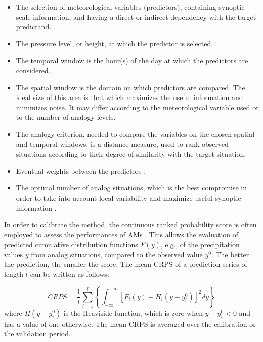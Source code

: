 \documentclass{ametsoc}
\begin{document}
\begin{itemize}
	\item The selection of meteorological variables (predictors), containing synoptic scale information, and having a direct or indirect dependency with the target predictand.
	\item The pressure level, or height, at which the predictor is selected.
	\item The temporal window is the hour(s) of the day at which the predictors are considered.
	\item The spatial window is the domain on which predictors are compared. The ideal size of this area is that which maximizes the useful information and minimizes noise. It may differ according to the meteorological variable used or to the number of analogy levels.
	\item The analogy criterion, needed to compare the variables on the chosen spatial and temporal windows, is a distance measure, used to rank observed situations according to their degree of similarity with the target situation.
	\item Eventual weights between the predictors \cite[e.g.,][]{Horton2012a, Junk2015}.
	\item The optimal number of analog situations, which is the best compromise in order to take into account local variability and maximize useful synoptic information \citep{Bontron2004}.
\end{itemize}

In order to calibrate the method, the continuous ranked probability score \citep[CRPS,][]{Brown1974, Matheson1976, Hersbach2000} is often employed to assess the performances of AMs \citep[see, e.g.,][]{Bontron2004, Bontron2005, BenDaoud2008, Horton2012, Marty2012, Radanovics2013, Chardon2014, Junk2015, BenDaoud2016, Caillouet2016}. This allows the evaluation of predicted cumulative distribution functions $F(y)$, e.g., of the precipitation values $y$ from analog situations, compared to the observed value $y^{0}$. The better the prediction, the smaller the score. The mean CRPS of a prediction series of length $l$ can be written as follows:

\begin{equation}
\label{eq:CRPS}
CRPS = \frac{1}{l} \sum_{i=1}^{l} \left\{  \int_{-\infty}^{+\infty} \left[ F_{i}(y)-H_{i}(y-y_{i}^{0})\right]^{2} dy \right\} 
\end{equation}
where $H(y-y_{i}^{0})$ is the Heaviside function, which is zero when $y-y_{i}^{0}<0$ and has a value of one otherwise. The mean CRPS is averaged over the calibration or the validation period.
\end{document}
